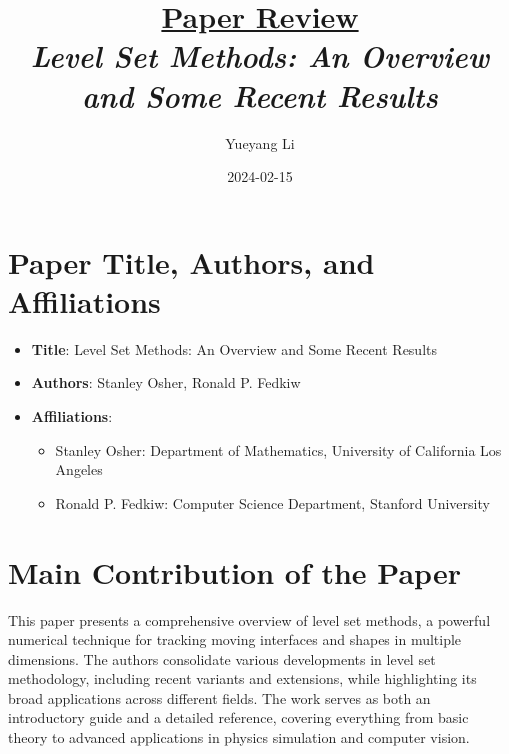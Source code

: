 \documentclass[12pt]{article}
\newcommand{\paperTitle}{
    \textit{\normalsize{Level Set Methods: An Overview and Some Recent Results}}
}
\begin{document}
\title{\Large\uline{\textbf{Paper Review}} \\[0.4em]
\paperTitle{} 
}
\author{Yueyang Li}
\date{2024-02-15}

\maketitle

\section{Paper Title, Authors, and Affiliations}
\begin{itemize}[noitemsep]
    \item \textbf{Title}: Level Set Methods: An Overview and Some Recent Results
    \item \textbf{Authors}: Stanley Osher, Ronald P. Fedkiw
    \item \textbf{Affiliations}:
    \begin{itemize}[noitemsep]
        \item Stanley Osher: Department of Mathematics, University of California Los Angeles
        \item Ronald P. Fedkiw: Computer Science Department, Stanford University
    \end{itemize}
\end{itemize}

\section{Main Contribution of the Paper}
This paper presents a comprehensive overview of level set methods, a powerful numerical technique for tracking moving interfaces and shapes in multiple dimensions. The authors consolidate various developments in level set methodology, including recent variants and extensions, while highlighting its broad applications across different fields. The work serves as both an introductory guide and a detailed reference, covering everything from basic theory to advanced applications in physics simulation and computer vision.
\end{document}
